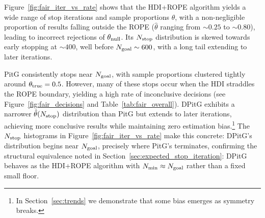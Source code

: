 Figure~\ref{fig:fair_iter_vs_rate} shows that the HDI+ROPE algorithm yields a wide range of stop
iterations and sample proportions $\hat{\theta}$, with a non-negligible proportion
of results falling outside the ROPE ($\hat{\theta}$ ranging from $\sim\!0.25$ to
$\sim\!0.80$), leading to incorrect rejections
of $\theta_{\rm null}$. Its $N_{\rm stop}$ distribution is skewed towards early stopping
at $\sim\!400$, well before $N_{\rm goal}\sim 600$, with a long tail extending to later
iterations.

PitG consistently stops near $N_{\rm goal}$, with sample proportions clustered tightly around
$\theta_{\rm true}=0.5$. However, many of these stops occur when the HDI straddles the
ROPE boundary, yielding a high rate of inconclusive decisions
(see Figure~\ref{fig:fair_decisions} and Table~\ref{tab:fair_overall}).
DPitG exhibits a narrower $\hat{\theta}(N_{\rm stop})$ distribution than PitG but extends
to later iterations, achieving more conclusive results while maintaining zero estimation bias.\footnote{
In Section~\ref{sec:trends} we demonstrate that some bias emerges as symmetry breaks.}
The $N_{\rm stop}$ histograms in Figure~\ref{fig:fair_iter_vs_rate} make this concrete:
DPitG's distribution begins near $N_{\rm goal}$, precisely where PitG's terminates,
confirming the structural equivalence noted in
Section~\ref{sec:expected_stop_iteration}: DPitG behaves as the HDI+ROPE algorithm with
$N_{\rm min} \approx N_{\rm goal}$ rather than a fixed small floor.


